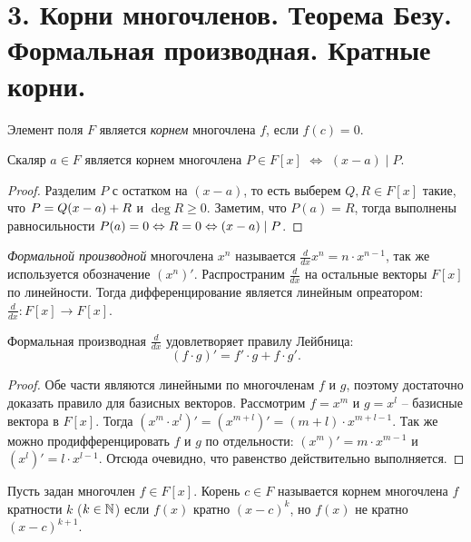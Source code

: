 \section{3. Корни многочленов. Теорема Безу. Формальная производная. Кратные корни.}

\begin{definition}
    Элемент поля $F$ является \textit{корнем} многочлена $f$, если $f(c) = 0$.
\end{definition}

\begin{theorem}[Безу]
	Скаляр $a \in F$ является корнем многочлена $P \in F[x]$ $\Leftrightarrow$ $(x - a)\mid P$.
\end{theorem}

\begin{proof}
	Разделим $P$ с остатком на $(x - a)$, то есть выберем $Q, R \in F[x]$ такие, что $P = Q(x - a) \hm{+} R$ и $\deg{R} \ge 0$. Заметим, что $P(a) = R$, тогда выполнены равносильности $P(a) = 0 \Leftrightarrow R = 0 \hm{\Leftrightarrow} (x - a)\mid P$.
\end{proof}

\begin{definition}
    \textit{Формальной производной} многочлена $x^n$ называется $\frac{d}{dx} x^n = n \cdot x^{n-1}$, так же используется обозначение $(x^n)'$. Распространим $\frac{d}{dx}$ на остальные векторы $F[x]$ по линейности. Тогда дифференцирование является линейным опреатором: $\frac{d}{dx}: F[x] \to F[x]$.
\end{definition}

\begin{proposition}
    Формальная производная $\frac{d}{dx}$ удовлетворяет правилу Лейбница: 
    $$(f \cdot g)' = f' \cdot g + f \cdot g'.$$
\end{proposition}

\begin{proof}
    Обе части являются линейными по многочленам $f$ и $g$, поэтому достаточно доказать правило для базисных векторов. Рассмотрим $f = x^m$ и $g = x^l$ -- базисные вектора в $F[x]$. Тогда $(x^m \cdot x^l)' = (x^{m+l})' = (m+l) \cdot x^{m+l-1}$. Так же можно продифференцировать $f$ и $g$ по отдельности: $(x^m)' = m \cdot x^{m-1}$ и $(x^l)' = l \cdot x^{l-1}$. Отсюда очевидно, что равенство действительно выполняется.
\end{proof}

\begin{definition}
    Пусть задан многочлен $f \in F[x]$. Корень $c \in F$ называется корнем многочлена $f$ кратности $k$ ($k\in \mathbb{N}$) если $f(x)$ кратно $(x-c)^k$, но $f(x)$ не кратно $(x-c)^{k+1}$.
\end{definition}

